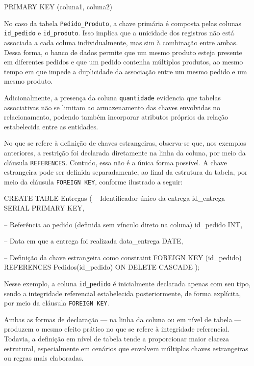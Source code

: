 \begin{sqlcode}
PRIMARY KEY (coluna1, coluna2)
\end{sqlcode}

No caso da tabela \texttt{Pedido\_Produto}, a chave primária é composta pelas colunas \texttt{id\_pedido} e \texttt{id\_produto}. Isso implica que a unicidade dos registros não está associada a cada coluna individualmente, mas sim à combinação entre ambas. Dessa forma, o banco de dados permite que um mesmo produto esteja presente em diferentes pedidos e que um pedido contenha múltiplos produtos, ao mesmo tempo em que impede a duplicidade da associação entre um mesmo pedido e um mesmo produto.

Adicionalmente, a presença da coluna \texttt{quantidade} evidencia que tabelas associativas não se limitam ao armazenamento das chaves envolvidas no relacionamento, podendo também incorporar atributos próprios da relação estabelecida entre as entidades.

No que se refere à definição de chaves estrangeiras, observa-se que, nos exemplos anteriores, a restrição foi declarada diretamente na linha da coluna, por meio da cláusula \texttt{REFERENCES}. Contudo, essa não é a única forma possível. A chave estrangeira pode ser definida separadamente, ao final da estrutura da tabela, por meio da cláusula \texttt{FOREIGN KEY}, conforme ilustrado a seguir:

\begin{sqlcode}
CREATE TABLE Entregas (
    -- Identificador único da entrega
    id_entrega SERIAL PRIMARY KEY,

    -- Referência ao pedido (definida sem vínculo direto na coluna)
    id_pedido INT,

    -- Data em que a entrega foi realizada
    data_entrega DATE,

    -- Definição da chave estrangeira como constraint
    FOREIGN KEY (id_pedido)
    REFERENCES Pedidos(id_pedido)
    ON DELETE CASCADE
);
\end{sqlcode}

Nesse exemplo, a coluna \texttt{id\_pedido} é inicialmente declarada apenas com seu tipo, sendo a integridade referencial estabelecida posteriormente, de forma explícita, por meio da cláusula \texttt{FOREIGN KEY}.

Ambas as formas de declaração — na linha da coluna ou em nível de tabela — produzem o mesmo efeito prático no que se refere à integridade referencial. Todavia, a definição em nível de tabela tende a proporcionar maior clareza estrutural, especialmente em cenários que envolvem múltiplas chaves estrangeiras ou regras mais elaboradas.

